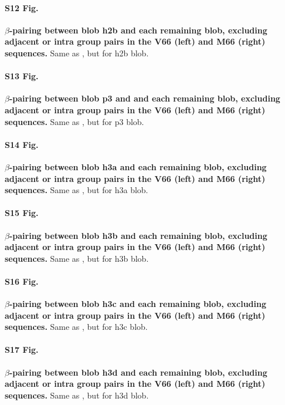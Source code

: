 \documentclass[10pt,letterpaper]{article}
\begin{document}
\paragraph*{S12 Fig.}
\label{S12_Fig}
{\bf $\beta$-pairing between blob h2b and each remaining blob, excluding adjacent or intra group pairs in the V66 (left) and M66 (right) sequences.} Same as , but for h2b blob.

\paragraph*{S13 Fig.}
\label{S13_Fig}
{\bf $\beta$-pairing between blob p3 and and each remaining blob, excluding adjacent or intra group pairs in the V66 (left) and M66 (right) sequences.} Same as , but for p3 blob.

\paragraph*{S14 Fig.}
\label{S14_Fig}
{\bf $\beta$-pairing between blob h3a and each remaining blob, excluding adjacent or intra group pairs in the V66 (left) and M66 (right) sequences.} Same as , but for h3a blob.

\paragraph*{S15 Fig.}
\label{S15_Fig}
{\bf $\beta$-pairing between blob h3b and each remaining blob, excluding adjacent or intra group pairs in the V66 (left) and M66 (right) sequences.} Same as , but for h3b blob.

\paragraph*{S16 Fig.}
\label{S16_Fig}
{\bf $\beta$-pairing between blob h3c and each remaining blob, excluding adjacent or intra group pairs in the V66 (left) and M66 (right) sequences.} Same as , but for h3c blob.

\paragraph*{S17 Fig.}
\label{S17_Fig}
{\bf $\beta$-pairing between blob h3d and each remaining blob, excluding adjacent or intra group pairs in the V66 (left) and M66 (right) sequences.} Same as , but for h3d blob.

%
%
\end{document}
